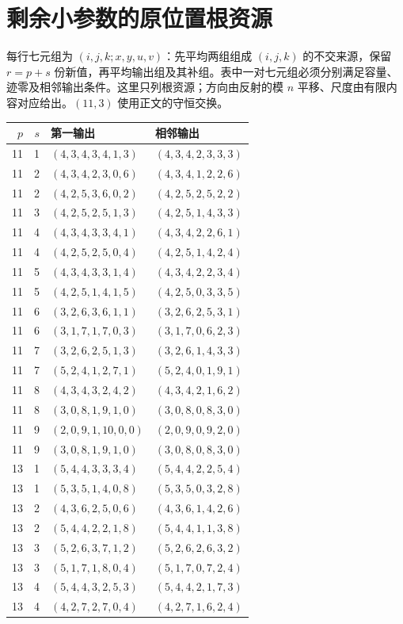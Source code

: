 \documentclass[11pt,a4paper]{article}
\theoremstyle{definition}
\numberwithin{equation}{section}
\begin{document}
\section{剩余小参数的原位置根资源}\label{sec:certificate}
每行七元组为 $(i,j,k;x,y,u,v)$：先平均两组组成 $(i,j,k)$ 的不交来源，保留 $r=p+s$ 份新值，再平均输出组及其补组。表中一对七元组必须分别满足容量、迹零及相邻输出条件。这里只列根资源；方向由反射的模 $n$ 平移、尺度由有限内容对应给出。$(11,3)$ 使用正文的守恒交换。
\small
\begin{longtable}{rrll}
\toprule $p$&$s$&第一输出&相邻输出\\\midrule\endhead
11&1&$(4,3,4,3,4,1,3)$&$(4,3,4,2,3,3,3)$\\
11&2&$(4,3,4,2,3,0,6)$&$(4,3,4,1,2,2,6)$\\
11&2&$(4,2,5,3,6,0,2)$&$(4,2,5,2,5,2,2)$\\
11&3&$(4,2,5,2,5,1,3)$&$(4,2,5,1,4,3,3)$\\
11&4&$(4,3,4,3,3,4,1)$&$(4,3,4,2,2,6,1)$\\
11&4&$(4,2,5,2,5,0,4)$&$(4,2,5,1,4,2,4)$\\
11&5&$(4,3,4,3,3,1,4)$&$(4,3,4,2,2,3,4)$\\
11&5&$(4,2,5,1,4,1,5)$&$(4,2,5,0,3,3,5)$\\
11&6&$(3,2,6,3,6,1,1)$&$(3,2,6,2,5,3,1)$\\
11&6&$(3,1,7,1,7,0,3)$&$(3,1,7,0,6,2,3)$\\
11&7&$(3,2,6,2,5,1,3)$&$(3,2,6,1,4,3,3)$\\
11&7&$(5,2,4,1,2,7,1)$&$(5,2,4,0,1,9,1)$\\
11&8&$(4,3,4,3,2,4,2)$&$(4,3,4,2,1,6,2)$\\
11&8&$(3,0,8,1,9,1,0)$&$(3,0,8,0,8,3,0)$\\
11&9&$(2,0,9,1,10,0,0)$&$(2,0,9,0,9,2,0)$\\
11&9&$(3,0,8,1,9,1,0)$&$(3,0,8,0,8,3,0)$\\
13&1&$(5,4,4,3,3,3,4)$&$(5,4,4,2,2,5,4)$\\
13&1&$(5,3,5,1,4,0,8)$&$(5,3,5,0,3,2,8)$\\
13&2&$(4,3,6,2,5,0,6)$&$(4,3,6,1,4,2,6)$\\
13&2&$(5,4,4,2,2,1,8)$&$(5,4,4,1,1,3,8)$\\
13&3&$(5,2,6,3,7,1,2)$&$(5,2,6,2,6,3,2)$\\
13&3&$(5,1,7,1,8,0,4)$&$(5,1,7,0,7,2,4)$\\
13&4&$(5,4,4,3,2,5,3)$&$(5,4,4,2,1,7,3)$\\
13&4&$(4,2,7,2,7,0,4)$&$(4,2,7,1,6,2,4)$\\

\end{longtable}
\end{document}
